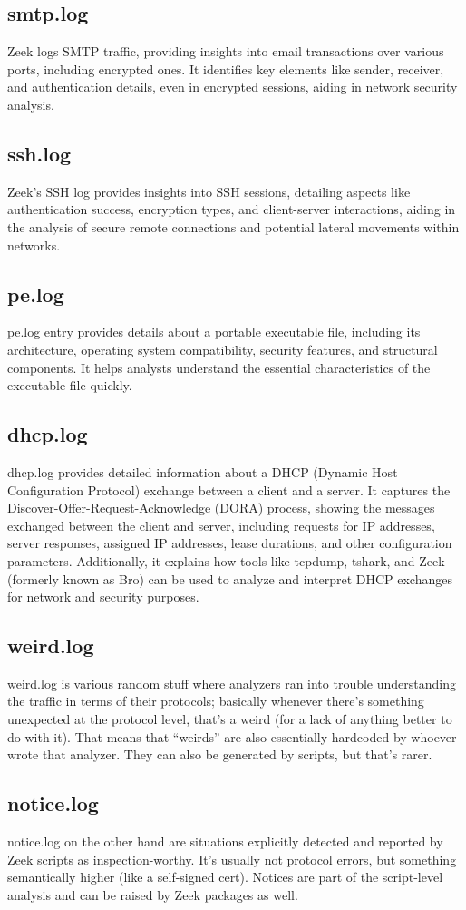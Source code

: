 \subsection{smtp.log}
Zeek logs SMTP traffic, providing insights into email transactions over various ports, including encrypted ones. It identifies key elements like sender, receiver, and authentication details, even in encrypted sessions, aiding in network security analysis.

\subsection{ssh.log}
Zeek's SSH log provides insights into SSH sessions, detailing aspects like authentication success, encryption types, and client-server interactions, aiding in the analysis of secure remote connections and potential lateral movements within networks.
\subsection{pe.log}
pe.log entry provides details about a portable executable file, including its architecture, operating system compatibility, security features, and structural components. It helps analysts understand the essential characteristics of the executable file quickly.


\subsection{dhcp.log}
dhcp.log provides detailed information about a DHCP (Dynamic Host Configuration Protocol) exchange between a client and a server. It captures the Discover-Offer-Request-Acknowledge (DORA) process, showing the messages exchanged between the client and server, including requests for IP addresses, server responses, assigned IP addresses, lease durations, and other configuration parameters. Additionally, it explains how tools like tcpdump, tshark, and Zeek (formerly known as Bro) can be used to analyze and interpret DHCP exchanges for network and security purposes.

\subsection{weird.log}
weird.log is various random stuff where analyzers ran into trouble understanding the traffic in terms of their protocols; basically whenever there’s something unexpected at the protocol level, that’s a weird (for a lack of anything better to do with it). That means that “weirds” are also essentially hardcoded by whoever wrote that analyzer. They can also be generated by scripts, but that’s rarer.

\subsection{notice.log}
notice.log on the other hand are situations explicitly detected and reported by Zeek scripts as inspection-worthy. It’s usually not protocol errors, but something semantically higher (like a self-signed cert). Notices are part of the script-level analysis and can be raised by Zeek packages as well.




